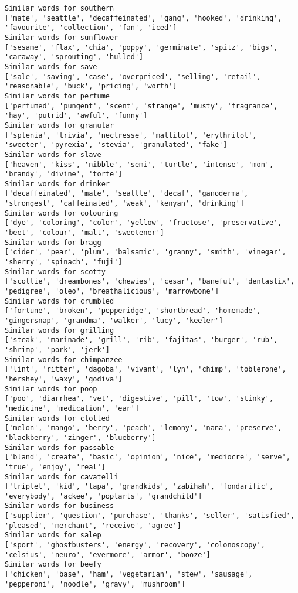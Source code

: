 \documentclass[11pt]{article}
\begin{document}
\begin{Verbatim}[commandchars=\\\{\}]
Similar words for southern
['mate', 'seattle', 'decaffeinated', 'gang', 'hooked', 'drinking', 'favourite', 'collection', 'fan', 'iced']
Similar words for sunflower
['sesame', 'flax', 'chia', 'poppy', 'germinate', 'spitz', 'bigs', 'caraway', 'sprouting', 'hulled']
Similar words for save
['sale', 'saving', 'case', 'overpriced', 'selling', 'retail', 'reasonable', 'buck', 'pricing', 'worth']
Similar words for perfume
['perfumed', 'pungent', 'scent', 'strange', 'musty', 'fragrance', 'hay', 'putrid', 'awful', 'funny']
Similar words for granular
['splenia', 'trivia', 'nectresse', 'maltitol', 'erythritol', 'sweeter', 'pyrexia', 'stevia', 'granulated', 'fake']
Similar words for slave
['heaven', 'kiss', 'nibble', 'semi', 'turtle', 'intense', 'mon', 'brandy', 'divine', 'torte']
Similar words for drinker
['decaffeinated', 'mate', 'seattle', 'decaf', 'ganoderma', 'strongest', 'caffeinated', 'weak', 'kenyan', 'drinking']
Similar words for colouring
['dye', 'coloring', 'color', 'yellow', 'fructose', 'preservative', 'beet', 'colour', 'malt', 'sweetener']
Similar words for bragg
['cider', 'pear', 'plum', 'balsamic', 'granny', 'smith', 'vinegar', 'sherry', 'spinach', 'fuji']
Similar words for scotty
['scottie', 'dreambones', 'chewies', 'cesar', 'baneful', 'dentastix', 'pedigree', 'oleo', 'breathalicious', 'marrowbone']
Similar words for crumbled
['fortune', 'broken', 'pepperidge', 'shortbread', 'homemade', 'gingersnap', 'grandma', 'walker', 'lucy', 'keeler']
Similar words for grilling
['steak', 'marinade', 'grill', 'rib', 'fajitas', 'burger', 'rub', 'shrimp', 'pork', 'jerk']
Similar words for chimpanzee
['lint', 'ritter', 'dagoba', 'vivant', 'lyn', 'chimp', 'toblerone', 'hershey', 'waxy', 'godiva']
Similar words for poop
['poo', 'diarrhea', 'vet', 'digestive', 'pill', 'tow', 'stinky', 'medicine', 'medication', 'ear']
Similar words for clotted
['melon', 'mango', 'berry', 'peach', 'lemony', 'nana', 'preserve', 'blackberry', 'zinger', 'blueberry']
Similar words for passable
['bland', 'create', 'basic', 'opinion', 'nice', 'mediocre', 'serve', 'true', 'enjoy', 'real']
Similar words for cavatelli
['triplet', 'kid', 'tapa', 'grandkids', 'zabihah', 'fondarific', 'everybody', 'ackee', 'poptarts', 'grandchild']
Similar words for business
['supplier', 'question', 'purchase', 'thanks', 'seller', 'satisfied', 'pleased', 'merchant', 'receive', 'agree']
Similar words for salep
['sport', 'ghostbusters', 'energy', 'recovery', 'colonoscopy', 'celsius', 'neuro', 'evermore', 'armor', 'booze']
Similar words for beefy
['chicken', 'base', 'ham', 'vegetarian', 'stew', 'sausage', 'pepperoni', 'noodle', 'gravy', 'mushroom']

\end{Verbatim}
\end{document}

